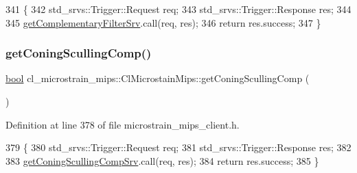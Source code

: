 \begin{DoxyCode}
341     \{
342         std\_srvs::Trigger::Request req;
343         std\_srvs::Trigger::Response res;
344 
345         \hyperlink{classcl__microstrain__mips_1_1ClMicrostainMips_a39aa3d9d1bbe86d90548f7422aa0b4a4}{getComplementaryFilterSrv}.call(req, res);
346         \textcolor{keywordflow}{return} res.success;
347     \}
\end{DoxyCode}
\mbox{\label{classcl__microstrain__mips_1_1ClMicrostainMips_a6826c989f0b2a29b87c6e78140dfe6d1}} 
\subsubsection{\texorpdfstring{get\+Coning\+Sculling\+Comp()}{getConingScullingComp()}}
{\footnotesize\ttfamily \hyperlink{classbool}{bool} cl\+\_\+microstrain\+\_\+mips\+::\+Cl\+Microstain\+Mips\+::get\+Coning\+Sculling\+Comp (\begin{DoxyParamCaption}{ }\end{DoxyParamCaption})\hspace{0.3cm}{\ttfamily [inline]}}



Definition at line 378 of file microstrain\+\_\+mips\+\_\+client.\+h.


\begin{DoxyCode}
379     \{
380         std\_srvs::Trigger::Request req;
381         std\_srvs::Trigger::Response res;
382 
383         \hyperlink{classcl__microstrain__mips_1_1ClMicrostainMips_a877393b5cf4c313e0e433e9c92163265}{getConingScullingCompSrv}.call(req, res);
384         \textcolor{keywordflow}{return} res.success;
385     \}
\end{DoxyCode}
\mbox{\label{classcl__microstrain__mips_1_1ClMicrostainMips_adbe8f64e2f6e4d48cd0efc84924b4d08}} 

